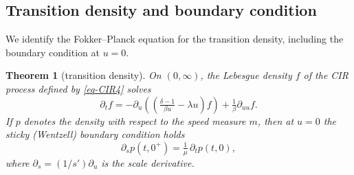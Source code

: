 \documentclass[aap,preprint]{imsart}
\numberwithin{equation}{section}
\theoremstyle{plain}
\newtheorem{theorem}{Theorem}[section]
\theoremstyle{definition}
\begin{document}
\subsection{Transition density and boundary
condition}\label{transition-density-and-boundary-condition}


We identify the Fokker--Planck equation for the transition density, including the boundary condition at $u=0$.

\begin{theorem}[transition density]\label{thm-pdf0}
  On $(0,\infty)$, the Lebesgue density $f$ of the CIR process defined by \cref{eq-CIR4} solves
  \[
  \partial_t f = -\partial_u\!\left(\left(\tfrac{\delta-1}{\beta u}
    -\lambda u\right)f\right) + \tfrac{1}{\beta}\partial_{uu}f.
  \]
  If $p$ denotes the density with respect to the speed measure $m$,
  then at $u=0$ the sticky (Wentzell) boundary condition holds
  \begin{equation}
    \label{eq-wentzell}
    \partial_s p(t,0^+) = \tfrac{1}{\mu}\,\partial_t p(t,0),
  \end{equation}
  where $\partial_s = (1/s')\partial_u$ is the scale derivative.
  \end{theorem}
  
\end{document}
